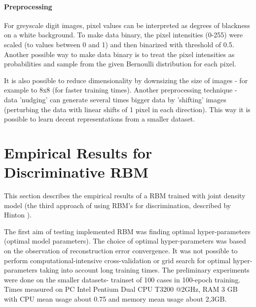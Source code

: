 \documentclass[a4paper]{scrartcl}
\begin{document}
\paragraph{Preprocessing} For greyscale digit images, pixel values can be interpreted as degrees of blackness on a white background. To make data binary, the pixel intensities (0-255) were scaled (to values between 0 and 1) and then binarized with threshold of 0.5. Another possible way to make data binary is to treat the pixel intensities as probabilities and sample from the given Bernoulli distribution for each pixel. 
\par It is also possible to reduce dimensionality by downsizing the size of images - for example to 8x8 (for faster training times). Another preprocessing technique - data 'nudging' can generate several times bigger data by 'shifting' images (perturbing the data with linear shifts of 1 pixel in each direction). This way it is possible to learn decent representations from a smaller dataset.
 
\newpage
 
\section{Empirical Results for Discriminative RBM}
This section describes the empirical results of a RBM trained with joint density model (the third approach of using RBM's for discrimination, described by Hinton \cite{Hinton}).
\par The first aim of testing implemented RBM was finding optimal hyper-parameters (optimal model parameters). The choice of optimal hyper-parameters was based on the observation of reconstruction error convergence. It was not possible to perform computational-intensive cross-validation or grid search for optimal hyper-parameters taking into account long training times. The preliminary experiments were done on the smaller datasets- trainset of 100 cases in 100-epoch training. Times measured on PC Intel Pentium Dual CPU T3200 @2GHz, RAM 3 GB with CPU mean usage about 0.75 and memory mean usage about 2,3GB.
\end{document}
